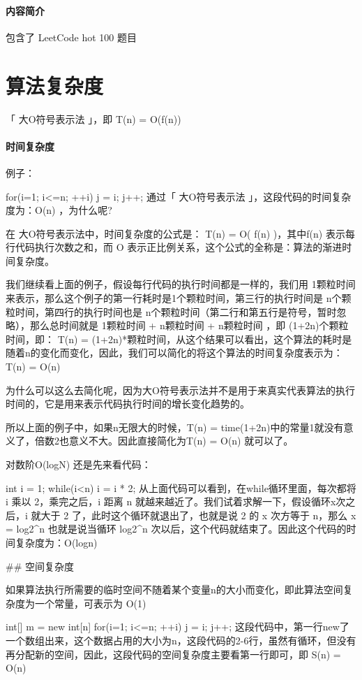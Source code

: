 \subsubsection{内容简介}

包含了 LeetCode hot 100 题目

\chapter{算法复杂度}

「 大O符号表示法 」，即 T(n) = O(f(n))

\subsubsection{时间复杂度}

例子：

for(i=1; i<=n; ++i)
{
   j = i;
   j++;
}
通过「 大O符号表示法 」，这段代码的时间复杂度为：O(n) ，为什么呢?

在 大O符号表示法中，时间复杂度的公式是： T(n) = O( f(n) )，其中f(n) 表示每行代码执行次数之和，而 O 表示正比例关系，这个公式的全称是：算法的渐进时间复杂度。

我们继续看上面的例子，假设每行代码的执行时间都是一样的，我们用 1颗粒时间 来表示，那么这个例子的第一行耗时是1个颗粒时间，第三行的执行时间是 n个颗粒时间，第四行的执行时间也是 n个颗粒时间（第二行和第五行是符号，暂时忽略），那么总时间就是 1颗粒时间 + n颗粒时间 + n颗粒时间 ，即 (1+2n)个颗粒时间，即： T(n) = (1+2n)*颗粒时间，从这个结果可以看出，这个算法的耗时是随着n的变化而变化，因此，我们可以简化的将这个算法的时间复杂度表示为：T(n) = O(n)

为什么可以这么去简化呢，因为大O符号表示法并不是用于来真实代表算法的执行时间的，它是用来表示代码执行时间的增长变化趋势的。

所以上面的例子中，如果n无限大的时候，T(n) = time(1+2n)中的常量1就没有意义了，倍数2也意义不大。因此直接简化为T(n) = O(n) 就可以了。

对数阶O(logN)
还是先来看代码：

int i = 1;
while(i<n)
{
    i = i * 2;
}
从上面代码可以看到，在while循环里面，每次都将 i 乘以 2，乘完之后，i 距离 n 就越来越近了。我们试着求解一下，假设循环x次之后，i 就大于 2 了，此时这个循环就退出了，也就是说 2 的 x 次方等于 n，那么 x = log2^n
也就是说当循环 log2^n 次以后，这个代码就结束了。因此这个代码的时间复杂度为：O(logn)

## 空间复杂度

如果算法执行所需要的临时空间不随着某个变量n的大小而变化，即此算法空间复杂度为一个常量，可表示为 O(1)

int[] m = new int[n]
for(i=1; i<=n; ++i)
{
   j = i;
   j++;
}
这段代码中，第一行new了一个数组出来，这个数据占用的大小为n，这段代码的2-6行，虽然有循环，但没有再分配新的空间，因此，这段代码的空间复杂度主要看第一行即可，即 S(n) = O(n)
